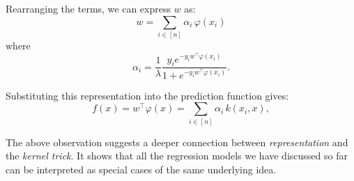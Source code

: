 \documentclass[../main]{subfiles}
\begin{document}
Rearranging the terms, we can express $w$ as:
\begin{equation}
    w = \sum_{i \in [n]} \alpha_i\, \varphi(x_i)
\end{equation}
where
\begin{equation}
    \alpha_i = \frac{1}{\lambda}\frac{y_i e^{-y_i w^\top \varphi(x_i)}}{1 + e^{-y_i w^\top \varphi(x_i)}}.
\end{equation}

Substituting this representation into the prediction function gives:
\begin{equation}
    f(x) = w^\top \varphi(x) = \sum_{i \in [n]} \alpha_i\, k(x_i, x),
\end{equation}

The above observation suggests a deeper connection between \emph{representation} and the \emph{kernel trick}.  
It shows that all the regression models we have discussed so far can be interpreted as  
special cases of the same underlying idea.
\end{document}
